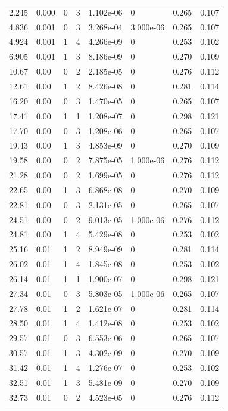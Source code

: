 \documentclass[preview]{standalone}
\begin{document}
{{\begin{tabular}{L{1.2cm}C{1.2cm} C{0.3cm}C{0.5cm} C{1.4cm}C{1.4cm} C{1.4cm}C{1.4cm}}
  2.245  &  0.000  & 0     &  3 &  1.102e-06  & 0  & 0.265 &  0.107   \\ 
  4.836  &  0.001  & 0     &  3 &  3.268e-04  & 3.000e-06  & 0.265 &  0.107   \\ 
  4.924  &  0.001  & 1     &  4 &  4.266e-09  & 0  & 0.253 &  0.102   \\ 
  6.905  &  0.001  & 1     &  3 &  8.186e-09  & 0  & 0.270 &  0.109   \\ 
  10.67  &  0.00  & 0     &  2 &  2.185e-05  & 0  & 0.276 &  0.112   \\ 
  12.61  &  0.00  & 1     &  2 &  8.426e-08  & 0  & 0.281 &  0.114   \\ 
  16.20  &  0.00  & 0     &  3 &  1.470e-05  & 0  & 0.265 &  0.107   \\ 
  17.41  &  0.00  & 1     &  1 &  1.208e-07  & 0  & 0.298 &  0.121   \\ 
  17.70  &  0.00  & 0     &  3 &  1.208e-06  & 0  & 0.265 &  0.107   \\ 
  19.43  &  0.00  & 1     &  3 &  4.853e-09  & 0  & 0.270 &  0.109   \\ 
  19.58  &  0.00  & 0     &  2 &  7.875e-05  & 1.000e-06  & 0.276 &  0.112   \\ 
  21.28  &  0.00  & 0     &  2 &  1.699e-05  & 0  & 0.276 &  0.112   \\ 
  22.65  &  0.00  & 1     &  3 &  6.868e-08  & 0  & 0.270 &  0.109   \\ 
  22.81  &  0.00  & 0     &  3 &  2.131e-05  & 0  & 0.265 &  0.107   \\ 
  24.51  &  0.00  & 0     &  2 &  9.013e-05  & 1.000e-06  & 0.276 &  0.112   \\ 
  24.81  &  0.00  & 1     &  4 &  5.429e-08  & 0  & 0.253 &  0.102   \\ 
  25.16  &  0.01  & 1     &  2 &  8.949e-09  & 0  & 0.281 &  0.114   \\ 
  26.02  &  0.01  & 1     &  4 &  1.845e-08  & 0  & 0.253 &  0.102   \\ 
  26.14  &  0.01  & 1     &  1 &  1.900e-07  & 0  & 0.298 &  0.121   \\ 
  27.34  &  0.01  & 0     &  3 &  5.803e-05  & 1.000e-06  & 0.265 &  0.107   \\ 
  27.78  &  0.01  & 1     &  2 &  1.621e-07  & 0  & 0.281 &  0.114   \\ 
  28.50  &  0.01  & 1     &  4 &  1.412e-08  & 0  & 0.253 &  0.102   \\ 
  29.57  &  0.01  & 0     &  3 &  6.553e-06  & 0  & 0.265 &  0.107   \\ 
  30.57  &  0.01  & 1     &  3 &  4.302e-09  & 0  & 0.270 &  0.109   \\ 
  31.42  &  0.01  & 1     &  4 &  1.276e-07  & 0  & 0.253 &  0.102   \\ 
  32.51  &  0.01  & 1     &  3 &  5.481e-09  & 0  & 0.270 &  0.109   \\ 
  32.73  &  0.01  & 0     &  2 &  4.523e-05  & 0  & 0.276 &  0.112   \\ 
\hline 
\end{tabular} 

}}
\end{document}
